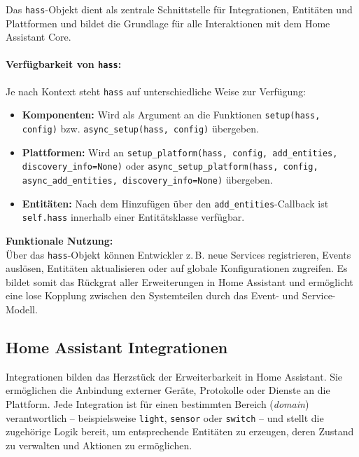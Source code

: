 Das \texttt{hass}-Objekt dient als zentrale Schnittstelle für Integrationen, Entitäten und Plattformen und bildet die Grundlage für alle Interaktionen mit dem Home Assistant Core.

\paragraph{Verfügbarkeit von \texttt{hass}:}

Je nach Kontext steht \texttt{hass} auf unterschiedliche Weise zur Verfügung:

\begin{itemize}
    \item \textbf{Komponenten:} Wird als Argument an die Funktionen \texttt{setup(hass, config)} bzw. \texttt{async\_setup(hass, config)} übergeben.\\
    
    \item \textbf{Plattformen:} Wird an  \texttt{setup\_platform(hass, config, add\_entities, discovery\_info=None)} oder \texttt{async\_setup\_platform(hass, config, async\_add\_entities, discovery\_info=None)} übergeben.\\
    
    \item \textbf{Entitäten:} Nach dem Hinzufügen über den \texttt{add\_entities}-Callback ist \texttt{self.hass} innerhalb einer Entitätsklasse verfügbar.
\end{itemize}

\textbf{Funktionale Nutzung:} \\

Über das \texttt{hass}-Objekt können Entwickler z.\,B. neue Services registrieren, Events auslösen, Entitäten aktualisieren oder auf globale Konfigurationen zugreifen. Es bildet somit das Rückgrat aller Erweiterungen in Home Assistant und ermöglicht eine lose Kopplung zwischen den Systemteilen durch das Event- und Service-Modell.


\subsection{Home Assistant Integrationen}

Integrationen bilden das Herzstück der Erweiterbarkeit in Home Assistant. Sie ermöglichen die Anbindung externer Geräte, Protokolle oder Dienste an die Plattform. Jede Integration ist für einen bestimmten Bereich (\textit{domain}) verantwortlich – beispielsweise \texttt{light}, \texttt{sensor} oder \texttt{switch} – und stellt die zugehörige Logik bereit, um entsprechende Entitäten zu erzeugen, deren Zustand zu verwalten und Aktionen zu ermöglichen.

